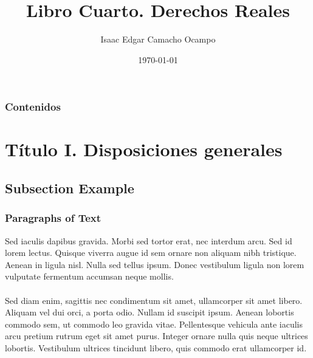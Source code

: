 \documentclass{beamer}
\title[Título]{Libro Cuarto. Derechos Reales} %
\author{Isaac Edgar Camacho Ocampo} %
\institute[UGR] %
{
  Universidad de Buenos Aires \\ %
  \medskip
  \textit{autor@ugr.correo.es} %
}
\date{\today} %
\begin{document}
\begin{frame}
\titlepage %
\end{frame}

\begin{frame}
  \frametitle{Contenidos} %
  \tableofcontents
\end{frame}




\section{Título I. Disposiciones generales} %

\subsection{Subsection Example} %

\begin{frame}
\frametitle{Paragraphs of Text}
Sed iaculis dapibus gravida. Morbi sed tortor erat, nec interdum arcu. Sed id lorem lectus. Quisque viverra augue id sem ornare non aliquam nibh tristique. Aenean in ligula nisl. Nulla sed tellus ipsum. Donec vestibulum ligula non lorem vulputate fermentum accumsan neque mollis.\\~\\

Sed diam enim, sagittis nec condimentum sit amet, ullamcorper sit amet libero. Aliquam vel dui orci, a porta odio. Nullam id suscipit ipsum. Aenean lobortis commodo sem, ut commodo leo gravida vitae. Pellentesque vehicula ante iaculis arcu pretium rutrum eget sit amet purus. Integer ornare nulla quis neque ultrices lobortis. Vestibulum ultrices tincidunt libero, quis commodo erat ullamcorper id.
\end{frame}
\end{document}
